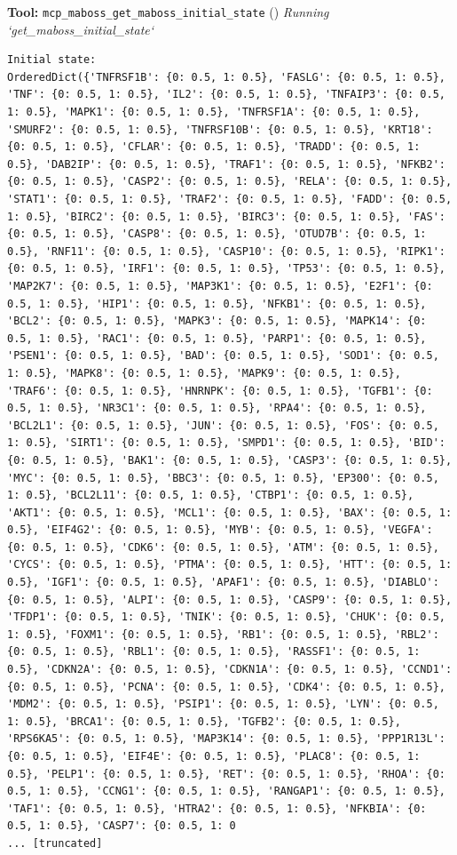 \documentclass[11pt,a4paper]{article}
\begin{document}
\begin{toolokbox}
\textbf{Tool:} \texttt{mcp\_maboss\_get\_maboss\_initial\_state} (\checkmark)
\textit{Running `get\_maboss\_initial\_state`}
\begin{lstlisting}
Initial state:
OrderedDict({'TNFRSF1B': {0: 0.5, 1: 0.5}, 'FASLG': {0: 0.5, 1: 0.5}, 'TNF': {0: 0.5, 1: 0.5}, 'IL2': {0: 0.5, 1: 0.5}, 'TNFAIP3': {0: 0.5, 1: 0.5}, 'MAPK1': {0: 0.5, 1: 0.5}, 'TNFRSF1A': {0: 0.5, 1: 0.5}, 'SMURF2': {0: 0.5, 1: 0.5}, 'TNFRSF10B': {0: 0.5, 1: 0.5}, 'KRT18': {0: 0.5, 1: 0.5}, 'CFLAR': {0: 0.5, 1: 0.5}, 'TRADD': {0: 0.5, 1: 0.5}, 'DAB2IP': {0: 0.5, 1: 0.5}, 'TRAF1': {0: 0.5, 1: 0.5}, 'NFKB2': {0: 0.5, 1: 0.5}, 'CASP2': {0: 0.5, 1: 0.5}, 'RELA': {0: 0.5, 1: 0.5}, 'STAT1': {0: 0.5, 1: 0.5}, 'TRAF2': {0: 0.5, 1: 0.5}, 'FADD': {0: 0.5, 1: 0.5}, 'BIRC2': {0: 0.5, 1: 0.5}, 'BIRC3': {0: 0.5, 1: 0.5}, 'FAS': {0: 0.5, 1: 0.5}, 'CASP8': {0: 0.5, 1: 0.5}, 'OTUD7B': {0: 0.5, 1: 0.5}, 'RNF11': {0: 0.5, 1: 0.5}, 'CASP10': {0: 0.5, 1: 0.5}, 'RIPK1': {0: 0.5, 1: 0.5}, 'IRF1': {0: 0.5, 1: 0.5}, 'TP53': {0: 0.5, 1: 0.5}, 'MAP2K7': {0: 0.5, 1: 0.5}, 'MAP3K1': {0: 0.5, 1: 0.5}, 'E2F1': {0: 0.5, 1: 0.5}, 'HIP1': {0: 0.5, 1: 0.5}, 'NFKB1': {0: 0.5, 1: 0.5}, 'BCL2': {0: 0.5, 1: 0.5}, 'MAPK3': {0: 0.5, 1: 0.5}, 'MAPK14': {0: 0.5, 1: 0.5}, 'RAC1': {0: 0.5, 1: 0.5}, 'PARP1': {0: 0.5, 1: 0.5}, 'PSEN1': {0: 0.5, 1: 0.5}, 'BAD': {0: 0.5, 1: 0.5}, 'SOD1': {0: 0.5, 1: 0.5}, 'MAPK8': {0: 0.5, 1: 0.5}, 'MAPK9': {0: 0.5, 1: 0.5}, 'TRAF6': {0: 0.5, 1: 0.5}, 'HNRNPK': {0: 0.5, 1: 0.5}, 'TGFB1': {0: 0.5, 1: 0.5}, 'NR3C1': {0: 0.5, 1: 0.5}, 'RPA4': {0: 0.5, 1: 0.5}, 'BCL2L1': {0: 0.5, 1: 0.5}, 'JUN': {0: 0.5, 1: 0.5}, 'FOS': {0: 0.5, 1: 0.5}, 'SIRT1': {0: 0.5, 1: 0.5}, 'SMPD1': {0: 0.5, 1: 0.5}, 'BID': {0: 0.5, 1: 0.5}, 'BAK1': {0: 0.5, 1: 0.5}, 'CASP3': {0: 0.5, 1: 0.5}, 'MYC': {0: 0.5, 1: 0.5}, 'BBC3': {0: 0.5, 1: 0.5}, 'EP300': {0: 0.5, 1: 0.5}, 'BCL2L11': {0: 0.5, 1: 0.5}, 'CTBP1': {0: 0.5, 1: 0.5}, 'AKT1': {0: 0.5, 1: 0.5}, 'MCL1': {0: 0.5, 1: 0.5}, 'BAX': {0: 0.5, 1: 0.5}, 'EIF4G2': {0: 0.5, 1: 0.5}, 'MYB': {0: 0.5, 1: 0.5}, 'VEGFA': {0: 0.5, 1: 0.5}, 'CDK6': {0: 0.5, 1: 0.5}, 'ATM': {0: 0.5, 1: 0.5}, 'CYCS': {0: 0.5, 1: 0.5}, 'PTMA': {0: 0.5, 1: 0.5}, 'HTT': {0: 0.5, 1: 0.5}, 'IGF1': {0: 0.5, 1: 0.5}, 'APAF1': {0: 0.5, 1: 0.5}, 'DIABLO': {0: 0.5, 1: 0.5}, 'ALPI': {0: 0.5, 1: 0.5}, 'CASP9': {0: 0.5, 1: 0.5}, 'TFDP1': {0: 0.5, 1: 0.5}, 'TNIK': {0: 0.5, 1: 0.5}, 'CHUK': {0: 0.5, 1: 0.5}, 'FOXM1': {0: 0.5, 1: 0.5}, 'RB1': {0: 0.5, 1: 0.5}, 'RBL2': {0: 0.5, 1: 0.5}, 'RBL1': {0: 0.5, 1: 0.5}, 'RASSF1': {0: 0.5, 1: 0.5}, 'CDKN2A': {0: 0.5, 1: 0.5}, 'CDKN1A': {0: 0.5, 1: 0.5}, 'CCND1': {0: 0.5, 1: 0.5}, 'PCNA': {0: 0.5, 1: 0.5}, 'CDK4': {0: 0.5, 1: 0.5}, 'MDM2': {0: 0.5, 1: 0.5}, 'PSIP1': {0: 0.5, 1: 0.5}, 'LYN': {0: 0.5, 1: 0.5}, 'BRCA1': {0: 0.5, 1: 0.5}, 'TGFB2': {0: 0.5, 1: 0.5}, 'RPS6KA5': {0: 0.5, 1: 0.5}, 'MAP3K14': {0: 0.5, 1: 0.5}, 'PPP1R13L': {0: 0.5, 1: 0.5}, 'EIF4E': {0: 0.5, 1: 0.5}, 'PLAC8': {0: 0.5, 1: 0.5}, 'PELP1': {0: 0.5, 1: 0.5}, 'RET': {0: 0.5, 1: 0.5}, 'RHOA': {0: 0.5, 1: 0.5}, 'CCNG1': {0: 0.5, 1: 0.5}, 'RANGAP1': {0: 0.5, 1: 0.5}, 'TAF1': {0: 0.5, 1: 0.5}, 'HTRA2': {0: 0.5, 1: 0.5}, 'NFKBIA': {0: 0.5, 1: 0.5}, 'CASP7': {0: 0.5, 1: 0
... [truncated]
\end{lstlisting}
\end{toolokbox}
\end{document}

